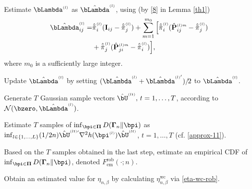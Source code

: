 \documentclass[10pt, twocolumn]{IEEEtran}
\begin{document}
\begin{algorithm}
\begin{algorithmic}[1]
\STATE Estimate $\bLambda^{\scriptscriptstyle{(l)}}$ as $\hat
{\bLambda}^{\scriptscriptstyle{(l)}}$, using (by \eqref{8} in
Lemma \ref{th1})
\begin{align*}
{{\hat \bLambda }^{\scriptscriptstyle{(l)}}_{ij}} = & {{\hat {\tilde \pi} }^{\scriptscriptstyle{(l)}}_i}( {{{\mathbf{I}}_{ij}} - {{\hat {\tilde \pi }}^{\scriptscriptstyle{(l)}}_j}} ) + \sum\limits_{m = 1}^{{m_0}} {} \Big[{{\hat {\tilde \pi }}^{\scriptscriptstyle{(l)}}_i}( {\hat {\mathbf{P}}_{ij}^{\scriptscriptstyle{(l)}m} - {{\hat {\tilde \pi} }^{\scriptscriptstyle{(l)}}_j}} ) \\
				&+ {{\hat {\tilde \pi} }^{\scriptscriptstyle{(l)}}_j}( {\hat {\mathbf{P}}_{ji}^{\scriptscriptstyle{(l)}m} - {{\hat {\tilde \pi} }^{\scriptscriptstyle{(l)}}_i}} )\Big], 
\end{align*}
where $m_0$ is a sufficiently large integer.

\STATE Update  $\hat {\bLambda}^{\scriptscriptstyle{(l)}}$ by setting
${(\hat{\bLambda}^{\scriptscriptstyle{(l)}} + \hat{\bLambda}^{\scriptscriptstyle{(l)}'}) \mathord{/ {\vphantom {1 2}} \kern-\nulldelimiterspace} 2}$ to $\hat {\bLambda}^{\scriptscriptstyle{(l)}}$.
				
\STATE Generate $T$ Gaussian sample vectors ${\hat
  {\bU}}^{\scriptscriptstyle{(lt)}}, \,t=1,\ldots,T$, according to
$\mathcal{N}( {\bzero, \hat{\bLambda}^{\scriptscriptstyle{(l)}} } )$.

\ENDFOR

\STATE Estimate $T$ samples of $\mathop {\inf }_{\bpi \in
  \boldsymbol{\Pi} } D( {{\boldsymbol{\Gamma} _n}\| \bpi } )$ as
$\mathop {\inf }_{l \in \{1, \ldots, L\} } (1/2n) {\hat
  \bU^{\scriptscriptstyle{(lt)}\prime}} {\nabla ^2}h(
{\bpi}^{\scriptscriptstyle{(l)}} )\hat \bU^{\scriptscriptstyle{(lt)}}$,
$t = 1, \ldots ,T$ (cf. \eqref{approx-11}).
				
\STATE Based on the $T$ samples obtained in the last step, estimate an
empirical CDF of $\mathop {\inf }_{\bpi \in \boldsymbol{\Pi} } D(
{{\boldsymbol{\Gamma} _n}\| \bpi } )$, denoted ${F^{\text{rob}}_{\text{em}}}( \cdot ;
n )$.

\STATE Obtain an estimated value for $\eta_{n,\beta}$ by calculating
$\eta_{n,\beta}^{\text{wc}}$ via \eqref{eta-wc-rob}.
\end{algorithmic}
\end{algorithm}
		
\end{document}
